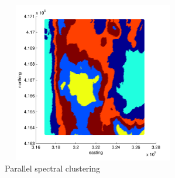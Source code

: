 \documentclass[12pt,letterpaper]{article}
\begin{document}

\begin{figure}[H]
\begin{centering}
 \includegraphics[width=8cm,height=7cm,keepaspectratio]{figs/Spectral_parallel.pdf}
 \caption{Parallel spectral clustering}
 \end{centering}
 \end{figure}
\end{document}
